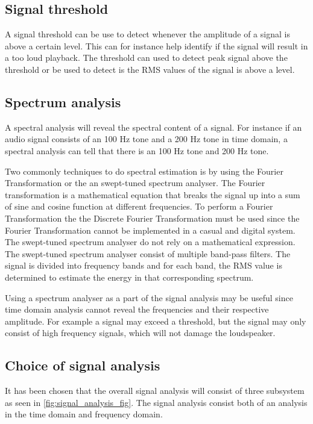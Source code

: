\subsection*{Signal threshold}
A signal threshold can be use to detect whenever the amplitude of a signal is above a certain level. This can for instance help identify if the signal will result in a too loud playback. The threshold can used to detect peak signal above the threshold or be used to detect is the RMS values of the signal is above a level.


\subsection*{Spectrum analysis}
A spectral analysis will reveal the spectral content of a signal. For instance if an audio signal consists of an 100 Hz tone and a 200 Hz tone in time domain, a spectral analysis can tell that there is an 100 Hz tone and 200 Hz tone. 

Two commonly techniques to do spectral estimation is by using the Fourier Transformation or the an swept-tuned spectrum analyser. The Fourier transformation is a mathematical equation that breaks the signal up into a sum of sine and cosine function at different frequencies. To perform a Fourier Transformation the the Discrete Fourier Transformation must be used since the Fourier Transformation cannot be implemented in a casual and digital system. The swept-tuned spectrum analyser do not rely on a mathematical expression. The swept-tuned spectrum analyser consist of multiple band-pass filters. The signal is divided into frequency bands and for each band, the RMS value is determined to estimate the energy in that corresponding spectrum. 

Using a spectrum analyser as a part of the signal analysis may be useful since time domain analysis cannot reveal the frequencies and their respective amplitude. For example a signal may exceed a threshold, but the signal may only consist of high frequency signals, which will not damage the loudspeaker. 


\subsection{Choice of signal analysis}
It has been chosen that the overall signal analysis will consist of three subsystem as seen in \autoref{fig:signal_analysis_fig}. The signal analysis consist both of an analysis in the time domain and frequency domain.

